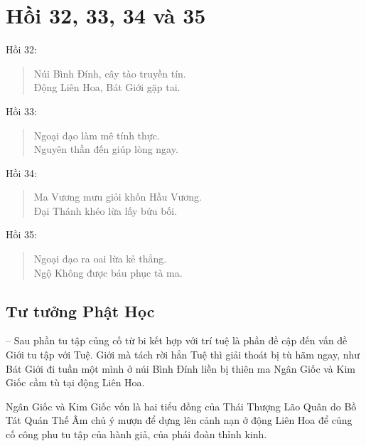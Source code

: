 \chapter{Hồi 32, 33, 34 và 35} %
\label{cha:hoi_33_34}

Hồi 32:

\begin{verse}
\begin{itshape}
Núi Bình Đính, cây tào truyền tín.\\
Động Liên Hoa, Bát Giới gặp tai.
\end{itshape}
\end{verse}

Hồi 33:

\begin{verse}
\begin{itshape}
Ngoại đạo làm mê tính thực.\\
Nguyên thần đến giúp lòng ngay.
\end{itshape}
\end{verse}

Hồi 34:

\begin{verse}
\begin{itshape}
Ma Vương mưu giỏi khốn Hầu Vương.\\
Đại Thánh khéo lừa lấy bửu bối.
\end{itshape}
\end{verse}

Hồi 35:

\begin{verse}
\begin{itshape}
Ngoại đạo ra oai lừa kẻ thẳng.\\
Ngộ Không được báu phục tà ma.
\end{itshape}
\end{verse}

\section{Tư tưởng Phật Học} %
\label{sec:33_34_phat_hoc}

-- Sau phần tu tập củng cố từ bi kết hợp với trí tuệ là phần đề cập đến vấn đề Giới tu tập với Tuệ. Giới mà tách rời hẳn Tuệ thì giải thoát bị tù hãm ngay, như Bát Giới đi tuần một mình ở núi Bình Đính liền bị thiên ma Ngân Giốc và Kim Giốc cầm tù tại động Liên Hoa.

Ngân Giốc và Kim Giốc vốn là hai tiểu đồng của Thái Thượng Lão Quân do Bồ Tát Quán Thế Âm chủ ý mượn để dựng lên cảnh nạn ở động Liên Hoa để củng cố công phu tu tập của hành giả, của phái đoàn thỉnh kinh.

